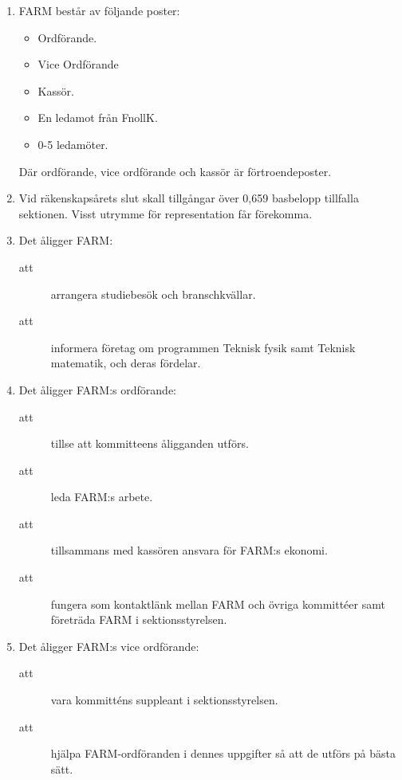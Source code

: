\documentclass[11pt,a4paper]{article}
\begin{document}
\begin{enumerate}[\thesubsection .1]

  \item FARM består av följande poster:
    \begin{itemize}
	 \item Ordförande.
         \item Vice Ordförande
	 \item Kassör.
	 \item En ledamot från FnollK.
	 \item 0-5 ledamöter.
   \end{itemize}
Där ordförande, vice ordförande och kassör är förtroendeposter.
 
  \item Vid räkenskapsårets slut skall tillgångar över 0,659 basbelopp tillfalla sektionen. Visst utrymme för representation får förekomma.

  \item Det åligger FARM:
    \begin{description}
      \item[att] arrangera studiebesök och branschkvällar.   
      \item[att] informera företag om programmen Teknisk fysik samt Teknisk matematik, och deras fördelar.
    \end{description}

  \item Det åligger FARM:s ordförande:
    \begin{description}
      \item[att] tillse att kommitteens åligganden utförs.
      \item[att] leda FARM:s arbete.
      \item[att] tillsammans med kassören ansvara för FARM:s ekonomi.
      \item[att] fungera som kontaktlänk mellan FARM och övriga kommittéer samt företräda FARM i sektionsstyrelsen.
    \end{description}

  \item Det åligger FARM:s vice ordförande:
    \begin{description}
      \item[att] vara kommitténs suppleant i sektionsstyrelsen.
      \item[att] hjälpa FARM-ordföranden i dennes uppgifter så att de utförs på bästa sätt.
    \end{description}


\end{enumerate}
\end{document}
